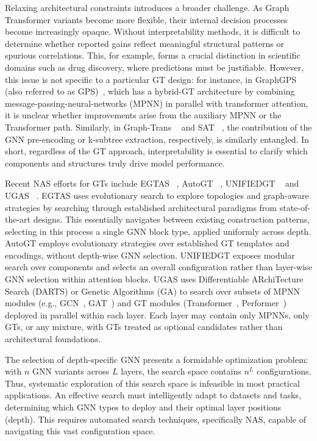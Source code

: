 \documentclass[lettersize,journal]{IEEEtran}
\begin{document}
Relaxing architectural constraints introduces a broader challenge. As Graph Transformer variants become more flexible, their internal decision processes become increasingly opaque. Without interpretability methods, it is difficult to determine whether reported gains reflect meaningful structural patterns or spurious correlations. This, for example, forms a crucial distinction in scientific domains such as drug discovery, where predictions must be justifiable. However, this issue is not specific to a particular GT design: for instance, in GraphGPS (also referred to as GPS)~\cite{rampa_recipe_nodate}, which has a hybrid-GT architecture by combining message-passing-neural-networks (MPNN) in parallel with transformer attention,  it is unclear whether improvements arise from the auxiliary MPNN or the Transformer path. Similarly, in Graph-Trans ~\cite{wu_representing_2022} and SAT ~\cite{chen_structure-aware_2022}, the contribution of the GNN pre-encoding or k-subtree extraction, respectively, is similarly entangled. In short, regardless of the GT approach, interpretability is essential to clarify which components and structures truly drive model performance.


Recent NAS efforts for GTs include EGTAS  ~\cite{wang_automatic_2024}, AutoGT  ~\cite{zhang_autogt_2023}, UNIFIEDGT  ~\cite{lin_unifiedgt_2024} and UGAS  ~\cite{song_towards_2025}. EGTAS uses evolutionary search to explore topologies and graph-aware strategies by searching through established architectural paradigms from state-of-the-art designs. This essentially navigates between existing construction patterns,  selecting in this process a single GNN block type, applied uniformly across depth. AutoGT employs evolutionary strategies over established GT templates and encodings, without depth-wise GNN selection. UNIFIEDGT exposes modular search over components and selects an overall configuration rather than layer-wise GNN selection within attention blocks. UGAS uses Differentiable ARchiTecture Search (DARTS) or Genetic Algorithms (GA) to search over subsets of MPNN modules (e.g., GCN~\cite{kipf_semi-supervised_2017}, GAT~\cite{velickovic_graph_2018}) and GT modules (Transformer~\cite{dwivedi_generalization_2021}, Performer~\cite{choromanski_rethinking_2022}) deployed in parallel within each layer. Each layer may contain only MPNNs, only GTs, or any mixture, with GTs treated as optional candidates rather than architectural foundations.

The selection of depth-specific GNN presents a formidable optimization problem: with $n$ GNN variants across $L$ layers, the search space contains $n^L$ configurations. Thus, systematic exploration of this search space is infeasible in most practical applications. An effective search must intelligently adapt to datasets and tasks, determining which GNN types to deploy and their optimal layer positions (depth). This requires automated search techniques, specifically NAS, capable of navigating this vast configuration space.
\end{document}
